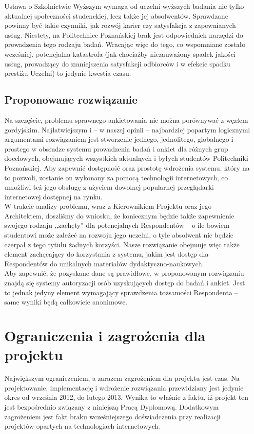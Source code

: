 Ustawa o Szkolnictwie Wyższym wymaga od uczelni wyższych badania nie tylko aktualnej społeczności studenckiej, lecz także jej absolwentów. Sprawdzane powinny być takie czynniki, jak rozwój karier czy satysfakcja z zapewnianych usług. Niestety, na Politechnice Poznańskiej brak jest odpowiednich narzędzi do prowadzenia tego rodzaju badań. Wracając więc do tego, co wspomniane zostało wcześniej, potencjalna katastrofa (jak chociażby niezauważony spadek jakości usług, prowadzący do zmniejszenia satysfakcji odbiorców i w efekcie spadku prestiżu Uczelni) to jedynie kwestia czasu. \\

\subsection{Proponowane rozwiązanie}
Na szczęście, problemu sprawnego ankietowania nie można porównywać z węzłem gordyjskim. Najłatwiejszym i -- w naszej opinii -- najbardziej popartym logicznymi argumentami rozwiązaniem jest stworzenie jednego, jednolitego, globalnego i prostego w obsłudze systemu prowadzenia badań i ankiet dla różnych grup docelowych, obejmujących wszystkich aktualnych i byłych studentów Politechniki Poznańskiej. Aby zapewnić dostępność oraz prostotę wdrożenia systemu, który na to pozwoli, zostanie on wykonany za pomocą technologii internetowych, co umożliwi też jego obsługę z użyciem dowolnej popularnej przeglądarki internetowej dostępnej na rynku. \\

W trakcie analizy problemu, wraz z Kierownikiem Projektu oraz jego Architektem, doszliśmy do wniosku, że koniecznym będzie także zapewnienie swojego rodzaju ,,zachęty'' dla potencjalnych Respondentów -- o ile bowiem studentowi może zależeć na rozwoju jego uczelni, o tyle absolwent nie będzie czerpał z tego tytułu żadnych korzyści. Nasze rozwiązanie obejmuje więc także element zachęcający do korzystania z systemu, jakim jest dostęp dla Respondentów do unikalnych materiałów dydaktyczno-naukowych. \\

Aby zapewnić, że pozyskane dane są prawidłowe, w proponowanym rozwiązaniu znajdą się systemy autoryzacji osób uzyskujących dostęp do badań i ankiet. Jest to jednak jedyny element wymagający sprawdzenia tożsamości Respondenta -- same wyniki będą całkowicie anonimowe. \\

\section{Ograniczenia i zagrożenia dla projektu}
Największym ograniczeniem, a zarazem zagrożeniem dla projektu jest czas. Na projektowanie, implementację i wdrożenie rozwiązania przewidziany jest jedynie okres od września 2012, do lutego 2013. Wynika to właśnie z faktu, iż projekt ten jest bezpośrednio związany z niniejszą Pracą Dyplomową. Dodatkowym zagrożeniem jest fakt braku wcześniejszego doświadczenia przy realizacji projektów opartych na technologiach internetowych.

